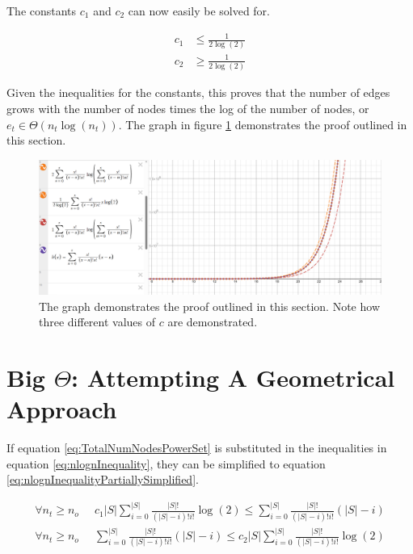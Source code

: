 \documentclass{article}
\begin{document}
The constants $c_1$ and $c_2$ can now easily be solved for.

\begin{equation}
    \begin{split}
        c_1 &\le \frac{1}{2\log(2)}
        \\
        c_2 &\ge \frac{1}{2\log(2)}
    \end{split}
    \label{eq:BoundaryInequalities}
\end{equation}

Given the inequalities for the constants, this proves that the number of edges grows with the number of nodes times the log of the number of nodes, or $e_t\in \Theta(n_t\log(n_t))$. The graph in figure \ref{fig:DesmosProof} demonstrates the proof outlined in this section.

\begin{figure}[h]
    \center
    \includegraphics[scale=0.4]{img/DesmosProof.png}
    \caption{The graph demonstrates the proof outlined in this section. Note how three different values of $c$ are demonstrated.}
    \label{fig:DesmosProof}
\end{figure}

\section{Big $\Theta$: Attempting A Geometrical Approach}
\label{sec:TigherBoundGeometricalApproach}

If equation \ref{eq:TotalNumNodesPowerSet} is substituted in the inequalities in equation \ref{eq:nlognInequality}, they can be simplified to equation \ref{eq:nlognInequalityPartiallySimplified}.

\begin{equation}
    \begin{split}
        \forall n_t\ge n_o \;\; &
        c_1|S|\sum_{i=0}^{|S|}\frac{|S|!}{(|S|-i)!i!}
        \log \left( 2 \right)
        \le
        \sum_{i=0}^{|S|}\frac{|S|!}{(|S|-i)!i!}(|S|-i)
        \\
        \forall n_t\ge n_o \;\; &
        \sum_{i=0}^{|S|}\frac{|S|!}{(|S|-i)!i!}(|S|-i)
        \le
        c_2|S|\sum_{i=0}^{|S|}\frac{|S|!}{(|S|-i)!i!}
        \log \left( 2 \right)
    \end{split}
    \label{eq:nlognInequalityPartiallySimplified}
\end{equation}
\end{document}
